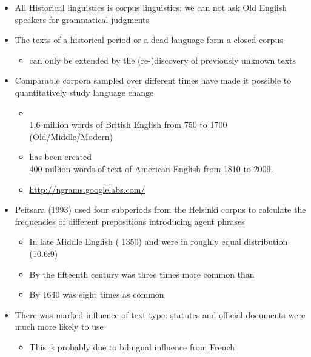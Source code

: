 \documentclass[a4paper,landscape,headrule,footrule,xetex]{foils}
\begin{document}
\begin{itemize}
\item All Historical linguistics is corpus linguistics: we can not ask
  Old English speakers for grammatical judgments
\item The texts of a historical period or a dead language form a closed corpus 
  \begin{itemize}  \item  can only be extended by the (re-)discovery of previously unknown texts
  \end{itemize}
\item Comparable corpora sampled over different times have made it
  possible to quantitatively study language change %
\begin{itemize}
\item {}
  \\ 1.6 million words of British English from 750 to 1700 (Old/Middle/Modern)
\item {} has been created
\\  400 million words of text of American English from 1810 to 2009. 
\item \url{http://ngrams.googlelabs.com/}
\end{itemize}
\end{itemize}



\begin{itemize}
\item  Peitsara (1993) used four subperiods from the Helsinki corpus to calculate the frequencies of different prepositions introducing agent phrases
  \begin{itemize}
  \item In late Middle English ( 1350)  and
     were in roughly equal distribution (10.6:9)
  \item By the fifteenth century  was three times more
    common than 
  \item By 1640  was eight times as common
  \end{itemize}
\item There was marked influence of text type: statutes and official
  documents were much more likely to use 
  \begin{itemize}
  \item This is probably due to bilingual influence from French
  \end{itemize}
\end{itemize}
\end{document}

